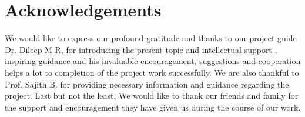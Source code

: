 \chapter*{Acknowledgements}

We  would like to express our profound gratitude and thanks to our project
guide Dr. Dileep M R, for introducing the present topic and intellectual support , inspiring guidance and his invaluable encouragement, suggestions and cooperation helps a lot to completion of the project work successfully. We are also thankful to Prof. Sajith B. for providing necessary information and guidance regarding the project. Last but not the least, We would like to thank
our friends and family for the support and encouragement they have given
us during the course of our work.




 
